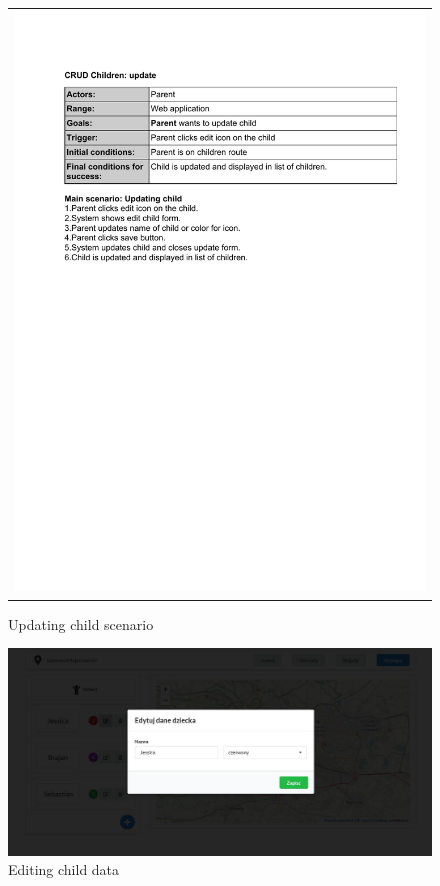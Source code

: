 \documentclass{sprawozdanie-agh}
\begin{document}
		\begin{figure}[H] 
			\centering
			\begin{tabular}{c}
				\includegraphics[width=.80\textwidth]{upC_cropped} 
			\end{tabular} 
		\caption{Updating child scenario}
		\end{figure}

		\begin{figure}[H]
			\centering
			\includegraphics[width=.80\textwidth]{editChild}
			\caption{Editing child data}
		\end{figure}
\end{document}
